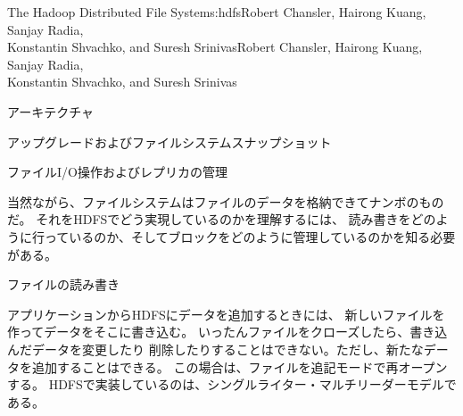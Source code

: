 \begin{aosachaptertoc}{The Hadoop Distributed File System}{s:hdfs}{Robert Chansler, Hairong Kuang, Sanjay Radia, \\ Konstantin Shvachko, and Suresh Srinivas}{Robert Chansler, Hairong Kuang, Sanjay Radia, \\ \hspace*{0.9cm} Konstantin Shvachko, and Suresh Srinivas}
\begin{aosasect1}{アーキテクチャ}
\begin{aosasect2}{アップグレードおよびファイルシステムスナップショット}
\end{aosasect2}

\end{aosasect1}

\begin{aosasect1}{ファイルI/O操作およびレプリカの管理}

当然ながら、ファイルシステムはファイルのデータを格納できてナンボのものだ。
それをHDFSでどう実現しているのかを理解するには、
読み書きをどのように行っているのか、そしてブロックをどのように管理しているのかを知る必要がある。

\begin{aosasect2}{ファイルの読み書き}

アプリケーションからHDFSにデータを追加するときには、
新しいファイルを作ってデータをそこに書き込む。
いったんファイルをクローズしたら、書き込んだデータを変更したり
削除したりすることはできない。ただし、新たなデータを追加することはできる。
この場合は、ファイルを追記モードで再オープンする。
HDFSで実装しているのは、シングルライター・マルチリーダーモデルである。


\end{aosasect2}
\end{aosasect1}
\end{aosachaptertoc}
